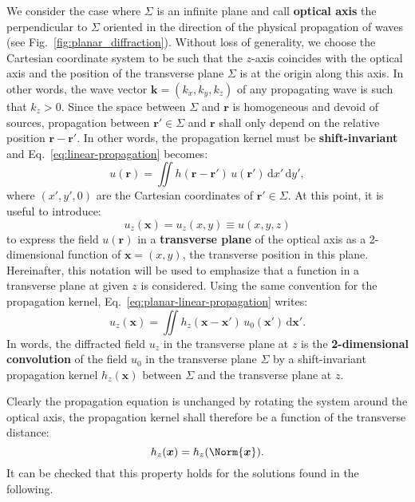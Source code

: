 \documentclass[a4paper]{article}
\newcommand*{\V}[1]{\boldsymbol{#1}}
\newcommand*{\mathd}{\mathrm{d}}
\begin{document}
We consider the case where $Σ$ is an infinite plane and call \textbf{optical axis} the
perpendicular to $Σ$ oriented in the direction of the physical propagation of waves (see
Fig.~\ref{fig:planar_diffraction}). Without loss of generality, we choose the Cartesian
coordinate system to be such that the $z$-axis coincides with the optical axis and the
position of the transverse plane $Σ$ is at the origin along this axis. In other words, the
wave vector $\V{k} = (k_{x},k_{y},k_{z})$ of any propagating wave is such that
$k_{z} > 0$. Since the space between $Σ$ and $\V{r}$ is homogeneous and devoid of sources,
propagation between $\V{r}' ∈ Σ$ and $\V{r}$ shall only depend on the relative position
$\V{r} - \V{r}'$. In other words, the propagation kernel must be \textbf{shift-invariant}
and Eq.~\eqref{eq:linear-propagation} becomes:
\begin{equation}
  \label{eq:planar-linear-propagation}
  u(\V{r}) = \iint h(\V{r} - \V{r}')\,u(\V{r}')\,\mathd x'\,\mathd y',
\end{equation}
where $(x',y',0)$ are the Cartesian coordinates of $\V{r}' ∈ Σ$. At this point, it is
useful to introduce:
\begin{equation}
  \label{eq:u_z}
  u_{z}(\V{x}) = u_{z}(x,y) ≡ u(x,y,z)
\end{equation}
to express the field $u(\V{r})$ in a \textbf{transverse plane} of the optical axis as a
2-dimensional function of $\V{x} = (x,y)$, the transverse position in this plane.
Hereinafter, this notation will be used to emphasize that a function in a transverse plane
at given $z$ is considered. Using the same convention for the propagation kernel,
Eq.~\eqref{eq:planar-linear-propagation} writes:
\begin{equation}
  \label{eq:convolutive-propagation}
  u_{z}(\V{x})
  = \iint h_{z}(\V{x} - \V{x}')\, u_{0}(\V{x}')\,\mathd\V{x}'.
\end{equation}
In words, the diffracted field $u_{z}$ in the transverse plane at $z$ is the
\textbf{2-dimensional convolution} of the field $u_{0}$ in the transverse plane $Σ$ by a
shift-invariant propagation kernel $h_{z}(\V{x})$ between $Σ$ and the transverse plane at
$z$.

Clearly the propagation equation is unchanged by rotating the system around the optical
axis, the propagation kernel shall therefore be a function of the transverse distance:
\begin{equation}
  \label{eq:invariance_by_rotation}
  h_{z}(\V{x}) = h_{z}(\Norm{\V{x}}).
\end{equation}
It can be checked that this property holds for the solutions found in the following.
\end{document}

